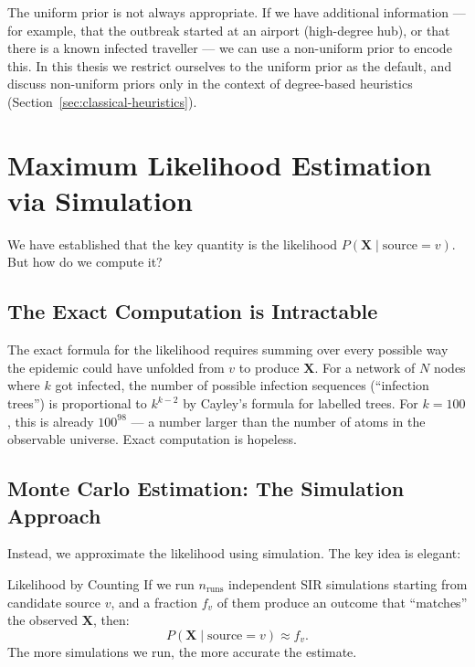 The uniform prior is not always appropriate. If we have additional information
— for example, that the outbreak started at an airport (high-degree hub), or
that there is a known infected traveller — we can use a non-uniform prior to
encode this. In this thesis we restrict ourselves to the uniform prior as the
default, and discuss non-uniform priors only in the context of degree-based
heuristics (Section~\ref{sec:classical-heuristics}).

\section{Maximum Likelihood Estimation via Simulation}
\label{sec:mle-simulation}

We have established that the key quantity is the likelihood
$P(\mathbf{X} \mid \text{source}=v)$. But how do we compute it?

\subsection{The Exact Computation is Intractable}

The exact formula for the likelihood requires summing over every possible
way the epidemic could have unfolded from $v$ to produce $\mathbf{X}$.
For a network of $N$ nodes where $k$ got infected, the number of possible
infection sequences (``infection trees'') is proportional to $k^{k-2}$
by Cayley's formula for labelled trees. For $k = 100$, this is already
$100^{98}$ — a number larger than the number of atoms in the observable
universe. Exact computation is hopeless.

\subsection{Monte Carlo Estimation: The Simulation Approach}

Instead, we approximate the likelihood using simulation. The key idea is
elegant:

\begin{conceptbox}{Likelihood by Counting}
If we run $n_{\text{runs}}$ independent SIR simulations starting from
candidate source $v$, and a fraction $f_v$ of them produce an outcome that
``matches'' the observed $\mathbf{X}$, then:
\[
    P(\mathbf{X} \mid \text{source}=v) \approx f_v.
\]
The more simulations we run, the more accurate the estimate.
\end{conceptbox}

